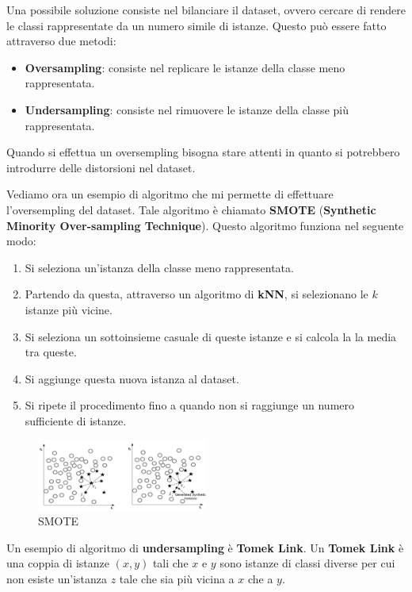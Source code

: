 Una possibile soluzione consiste nel bilanciare il dataset, ovvero cercare di
rendere le classi rappresentate da un numero simile di istanze. Questo può essere
fatto attraverso due metodi:
\begin{itemize}
      \item \textbf{Oversampling}: consiste nel replicare le istanze della classe
            meno rappresentata.
      \item \textbf{Undersampling}: consiste nel rimuovere le istanze della classe
            più rappresentata.
\end{itemize}
\begin{nota}
      Quando si effettua un oversempling bisogna stare attenti in quanto si
      potrebbero introdurre delle distorsioni nel dataset.
\end{nota}
Vediamo ora un esempio di algoritmo che mi permette di effettuare l'oversempling
del dataset. Tale algoritmo è chiamato \textbf{SMOTE} (\textbf{Synthetic Minority
      Over-sampling Technique}). Questo algoritmo funziona nel seguente modo:
\begin{enumerate}
      \item Si seleziona un'istanza della classe meno rappresentata.
      \item Partendo da questa, attraverso un algoritmo di \textbf{kNN}, si
            selezionano le $k$ istanze più vicine.
      \item Si seleziona un sottoinsieme casuale di queste istanze e si calcola la
            la media tra queste.
      \item Si aggiunge questa nuova istanza al dataset.
      \item Si ripete il procedimento fino a quando non si raggiunge un numero
            sufficiente di istanze.
\end{enumerate}
\begin{figure}[!ht]
      \centering
      \includegraphics[width=0.5\textwidth]{./img/Preprocessing/smote.png}
      \caption{SMOTE}
      \label{fig:smote}
\end{figure}

Un esempio di algoritmo di \textbf{undersampling} è \textbf{Tomek Link}. Un
\textbf{Tomek Link} è una coppia di istanze $(x, y)$ tali che $x$ e $y$ sono
istanze di classi diverse per cui non esiste un'istanza $z$ tale che sia più
vicina a $x$ che a $y$.

